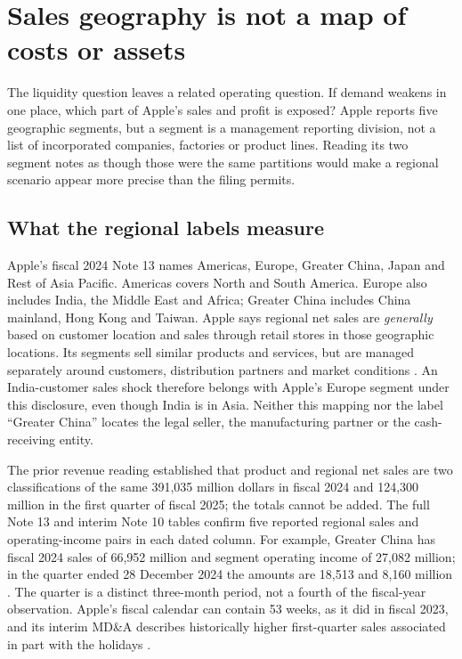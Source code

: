 \section{Sales geography is not a map of costs or assets}
\label{sec:apple-segments}

The liquidity question leaves a related operating question. If demand weakens
in one place, which part of Apple's sales and profit is exposed? Apple reports
five geographic segments, but a segment is a management reporting division,
not a list of incorporated companies, factories or product lines. Reading its
two segment notes as though those were the same partitions would make a
regional scenario appear more precise than the filing permits.

\subsection{What the regional labels measure}

Apple's fiscal 2024 Note 13 names Americas, Europe, Greater China, Japan and
Rest of Asia Pacific. Americas covers North and South America. Europe also
includes India, the Middle East and Africa; Greater China includes China
mainland, Hong Kong and Taiwan. Apple says regional net sales are
\emph{generally} based on customer location and sales through retail stores
in those geographic locations. Its segments sell similar products and
services, but are managed separately around customers, distribution partners
and market conditions \citep[Note 13, printed pp.~46--47]{apple2024}. An
India-customer sales shock therefore belongs with Apple's Europe segment
under this disclosure, even though India is in Asia. Neither this mapping
nor the label ``Greater China'' locates the legal seller, the manufacturing
partner or the cash-receiving entity.

The prior revenue reading established that product and regional net sales are
two classifications of the same 391,035 million dollars in fiscal 2024 and
124,300 million in the first quarter of fiscal 2025; the totals cannot be
added. The full Note 13 and interim Note 10 tables confirm five reported
regional sales and operating-income pairs in each dated column. For example,
Greater China has fiscal 2024 sales of 66,952 million and segment operating
income of 27,082 million; in the quarter ended 28 December 2024 the amounts
are 18,513 and 8,160 million
\citep[Note 13, printed p.~47]{apple2024}
\citep[Note 10, printed p.~11]{apple2025q1}. The quarter is a distinct
three-month period, not a fourth of the fiscal-year observation. Apple's
fiscal calendar can contain 53 weeks, as it did in fiscal 2023, and its
interim MD\&A describes historically higher first-quarter sales associated
in part with the holidays \citep[Note 1 and MD\&A]{apple2024,apple2025q1}.

